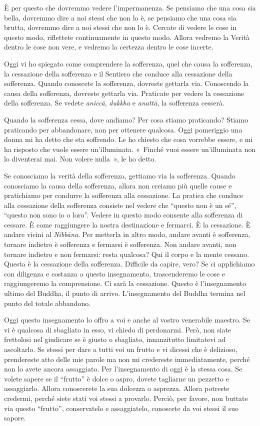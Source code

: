 È per questo che dovremmo vedere l'impermanenza. Se pensiamo che una
cosa sia bella, dovremmo dire a noi stessi che non lo è, se pensiamo che
una cosa sia brutta, dovremmo dire a noi stessi che non lo è. Cercate di
vedere le cose in questo modo, riflettete continuamente in questo modo.
Allora vedremo la Verità dentro le cose non vere, e vedremo la certezza
dentro le cose incerte.

Oggi vi ho spiegato come comprendere la sofferenza, quel che causa la
sofferenza, la cessazione della sofferenza e il Sentiero che conduce
alla cessazione della sofferenza. Quando conoscete la sofferenza,
dovreste gettarla via. Conoscendo la causa della sofferenza, dovreste
gettarla via. Praticate per vedere la cessazione della sofferenza. Se
vedete \emph{aniccā}, \emph{dukkha} e \emph{anattā}, la sofferenza
cesserà.

Quando la sofferenza cessa, dove andiamo? Per cosa stiamo praticando?
Stiamo praticando per abbandonare, non per ottenere qualcosa. Oggi
pomeriggio una donna mi ha detto che sta soffrendo. Le ho chiesto che
cosa vorrebbe essere, e mi ha risposto che vuole essere un'illuminata.
«~Finché vuoi essere un'illuminata non lo diventerai mai. Non volere
nulla~», le ho detto.

Se conosciamo la verità della sofferenza, gettiamo via la sofferenza.
Quando conosciamo la causa della sofferenza, allora non creiamo più
quelle cause e pratichiamo per condurre la sofferenza alla cessazione.
La pratica che conduce alla cessazione della sofferenza consiste nel
vedere che ``questo non è un sé'', ``questo non sono io o loro''. Vedere
in questo modo consente alla sofferenza di cessare. È come raggiungere
la nostra destinazione e fermarci. È la cessazione. È andare vicini al
\emph{Nibbāna}. Per metterla in altro modo, andare avanti è sofferenza,
tornare indietro è sofferenza e fermarsi è sofferenza. Non andare
avanti, non tornare indietro e non fermarsi: resta qualcosa? Qui il
corpo e la mente cessano. Questa è la cessazione della sofferenza.
Difficile da capire, vero? Se ci applichiamo con diligenza e costanza a
questo insegnamento, trascenderemo le cose e raggiungeremo la
comprensione. Ci sarà la cessazione. Questo è l'insegnamento ultimo del
Buddha, il punto di arrivo. L'insegnamento del Buddha termina nel punto
del totale abbandono.

Oggi questo insegnamento lo offro a voi e anche al vostro venerabile
maestro. Se vi è qualcosa di sbagliato in esso, vi chiedo di perdonarmi.
Però, non siate frettolosi nel giudicare se è giusto o sbagliato,
innanzitutto limitatevi ad ascoltarlo. Se stessi per dare a tutti voi un
frutto e vi dicessi che è delizioso, prendereste atto delle mie parole
ma non mi credereste immediatamente, perché non lo avete ancora
assaggiato. Per l'insegnamento di oggi è la stessa cosa. Se volete
sapere se il ``frutto'' è dolce o aspro, dovete tagliarne un pezzetto e
assaggiarlo. Allora conoscerete la sua dolcezza o asprezza. Allora
potreste credermi, perché siete stati voi stessi a provarlo. Perciò, per
favore, non buttate via questo ``frutto'', conservatelo e assaggiatelo,
conoscete da voi stessi il suo sapore.

